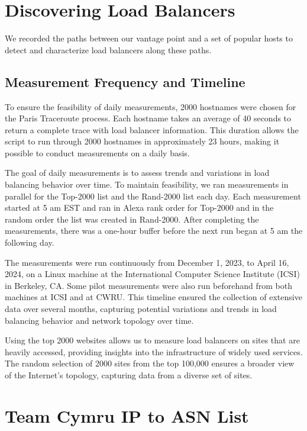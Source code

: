 \documentclass[12pt]{cwru_thesis}
\begin{document}
\section{Discovering Load Balancers}

We recorded the paths between our vantage point and a set of popular hosts to detect and characterize load balancers along these paths. 

\subsection{Measurement Frequency and Timeline}
\label{subsec:freq}


To ensure the feasibility of daily measurements, 2000 hostnames were chosen for the Paris Traceroute process. Each hostname takes an average of 40 seconds to return a complete trace with load balancer information. This duration allows the script to run through 2000 hostnames in approximately 23 hours, making it possible to conduct measurements on a daily basis.

The goal of daily measurements is to assess trends and variations in load balancing behavior over time. To maintain feasibility, we ran measurements in parallel for the Top-2000 list and the Rand-2000 list each day. Each measurement started at 5 am EST and ran in Alexa rank order for Top-2000 and in the random order the list was created in Rand-2000. After completing the measurements, there was a one-hour buffer before the next run began at 5 am the following day.

The measurements were run continuously from December 1, 2023, to April 16, 2024, on a Linux machine at the International Computer Science Institute (ICSI) in Berkeley, CA. Some pilot measurements were also run beforehand from both machines at ICSI and at CWRU.
This timeline ensured the collection of extensive data over several months, capturing potential variations and trends in load balancing behavior and network topology over time. 

Using the top 2000 websites allows us to measure load balancers on sites that are heavily accessed, providing insights into the infrastructure of widely used services. The random selection of 2000 sites from the top 100,000 ensures a broader view of the Internet's topology, capturing data from a diverse set of sites.



\section{Team Cymru IP to ASN List}
\end{document}

